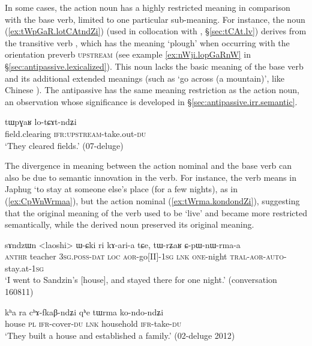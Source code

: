 In some cases, the action noun has a highly restricted meaning in comparison with the base verb, limited to one particular sub-meaning. For instance, the noun  (\ref{ex:tWpGaR.lotCAtndZi}) (used in collocation with , §\ref{sec:tCAt.lv}) derives from the transitive verb , which has the meaning `plough' when occurring with the orientation preverb \textsc{upstream} (see example \ref{ex:nWji.lopGaRnW} in §\ref{sec:antipassive.lexicalized}). This noun lacks the basic meaning of the base verb and its additional extended meanings (such as `go across (a mountain)', like Chinese ). The antipassive  has the same meaning restriction as the action noun, an observation whose significance is developed in §\ref{sec:antipassive.irr.semantic}.

\begin{exe}
\ex \label{ex:tWpGaR.lotCAtndZi}
\gll tɯpɣaʁ lo-tɕɤt-ndʑi \\
field.clearing \textsc{ifr}:\textsc{upstream}-take.out-\textsc{du} \\
\glt `They cleared fields.' (07-deluge) 
\end{exe} 

The divergence in meaning between the action nominal and the base verb can also be due to semantic innovation in the verb. For instance, the verb  means in Japhug `to stay at someone else's place (for a few nights), as in (\ref{ex:CpWnWrmaa}), but the action nominal  (\ref{ex:tWrma.kondondZi}), suggesting that the original meaning of the verb used to be `live' and became more restricted semantically, while the derived noun preserved its original meaning.

\begin{exe}
\ex \label{ex:CpWnWrmaa}
\gll sɤndzɯn <laoshi> ɯ-ɕki ri kɤ-ari-a tɕe, tɯ-rʑaʁ ɕ-pɯ-nɯ-rma-a \\
\textsc{anthr} teacher \textsc{3sg}.\textsc{poss}-\textsc{dat} \textsc{loc} \textsc{aor}-go[II]-\textsc{1sg} \textsc{lnk} \textsc{one}-night \textsc{tral}-\textsc{aor}-\textsc{auto}-stay.at-\textsc{1sg} \\
\glt `I went to Sandzin's [house], and stayed there for one night.' (conversation 160811)
\end{exe}

\begin{exe}
\ex \label{ex:tWrma.kondondZi}
\gll kʰa ra cʰɤ-fkaβ-ndʑi qʰe tɯrma ko-ndo-ndʑi \\
house \textsc{pl} \textsc{ifr}-cover-\textsc{du} \textsc{lnk} household \textsc{ifr}-take-\textsc{du} \\
\glt `They built a house and established a family.' (02-deluge 2012)
\end{exe}

